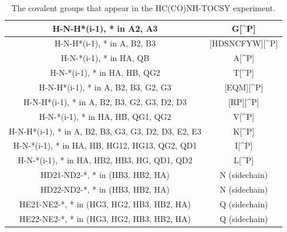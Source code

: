 \begin{table}
  \begin{tabular}{ | c | c | }
    \hline
    H-N-H*(i-1), * in A2, A3                          &  G[\^{}P]             \\  \hline
    H-N-H*(i-1), * in A, B2, B3                       &  [HDSNCFYW][\^{}P]    \\  \hline
    H-N-*(i-1), * in HA, QB                           &  A[\^{}P]             \\  \hline
    H-N-*(i-1), * in HA, HB, QG2                      &  T[\^{}P]             \\  \hline
    H-N-H*(i-1), * in A, B2, B3, G2, G3           &  [EQM][\^{}P]         \\  \hline
    H-N-H*(i-1), * in A, B2, B3, G2, G3, D2, D3       &  [RP][\^{}P]          \\  \hline
    H-N-*(i-1), * in HA, HB, QG1, QG2                 &  V[\^{}P]             \\  \hline
    H-N-H*(i-1), * in A, B2, B3, G3, G3, D2, D3, E2, E3   &  K[\^{}P] \\  \hline
    H-N-*(i-1), * in HA, HB, HG12, HG13, QG2, QD1     &  I[\^{}P]             \\  \hline
    H-N-*(i-1), * in HA, HB2, HB3, HG, QD1, QD2       &  L[\^{}P]             \\  \hline
    HD21-ND2-*, * in (HB3, HB2, HA)   &  N (sidechain)                  \\  \hline
    HD22-ND2-*, * in (HB3, HB2, HA)   &  N (sidechain)                  \\  \hline
    HE21-NE2-*, * in (HG3, HG2, HB3, HB2, HA)   &  Q (sidechain)        \\  \hline
    HE22-NE2-*, * in (HG3, HG2, HB3, HB2, HA)   &  Q (sidechain)        \\  \hline
  \end{tabular}
  \caption{The covalent groups that appear in the HC(CO)NH-TOCSY experiment.}
  \label{hcconh_peaktypes}
\end{table}


